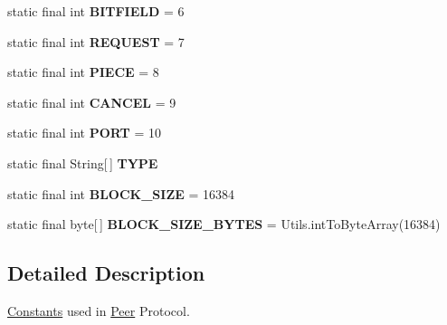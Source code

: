 \begin{DoxyCompactItemize}
\item 
\hypertarget{classj_bittorrent_a_p_i_1_1_peer_protocol_a60f464e8e444f997383e3e96b1e2538b}{
static final int {\bfseries BITFIELD} = 6}
\label{classj_bittorrent_a_p_i_1_1_peer_protocol_a60f464e8e444f997383e3e96b1e2538b}

\item 
\hypertarget{classj_bittorrent_a_p_i_1_1_peer_protocol_a7c31fe8483eb6b926c0edbc4e815e3fb}{
static final int {\bfseries REQUEST} = 7}
\label{classj_bittorrent_a_p_i_1_1_peer_protocol_a7c31fe8483eb6b926c0edbc4e815e3fb}

\item 
\hypertarget{classj_bittorrent_a_p_i_1_1_peer_protocol_aa1e309f30a3e7c591d0e2d4ae32c6186}{
static final int {\bfseries PIECE} = 8}
\label{classj_bittorrent_a_p_i_1_1_peer_protocol_aa1e309f30a3e7c591d0e2d4ae32c6186}

\item 
\hypertarget{classj_bittorrent_a_p_i_1_1_peer_protocol_aee4e740a4c7e0919c9cb5a4e9465249c}{
static final int {\bfseries CANCEL} = 9}
\label{classj_bittorrent_a_p_i_1_1_peer_protocol_aee4e740a4c7e0919c9cb5a4e9465249c}

\item 
\hypertarget{classj_bittorrent_a_p_i_1_1_peer_protocol_acbccb15bd5a17e5d6cd89de4c1d82afc}{
static final int {\bfseries PORT} = 10}
\label{classj_bittorrent_a_p_i_1_1_peer_protocol_acbccb15bd5a17e5d6cd89de4c1d82afc}

\item 
static final String\mbox{[}$\,$\mbox{]} {\bfseries TYPE}
\item 
\hypertarget{classj_bittorrent_a_p_i_1_1_peer_protocol_a74731008de986f350c85e32fc0f89d27}{
static final int {\bfseries BLOCK\_\-SIZE} = 16384}
\label{classj_bittorrent_a_p_i_1_1_peer_protocol_a74731008de986f350c85e32fc0f89d27}

\item 
\hypertarget{classj_bittorrent_a_p_i_1_1_peer_protocol_ad1db38019be98ae8c66e0a1f27994e77}{
static final byte\mbox{[}$\,$\mbox{]} {\bfseries BLOCK\_\-SIZE\_\-BYTES} = Utils.intToByteArray(16384)}
\label{classj_bittorrent_a_p_i_1_1_peer_protocol_ad1db38019be98ae8c66e0a1f27994e77}

\end{DoxyCompactItemize}


\subsection{Detailed Description}
\hyperlink{classj_bittorrent_a_p_i_1_1_constants}{Constants} used in \hyperlink{classj_bittorrent_a_p_i_1_1_peer}{Peer} Protocol.

